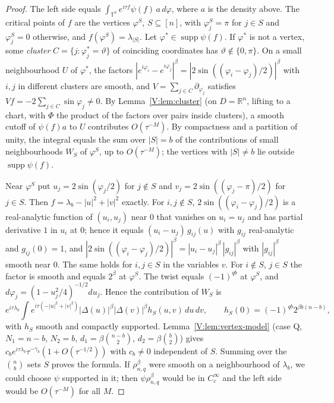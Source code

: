\documentclass[11pt,a4paper]{article}
\theoremstyle{definition}
\theoremstyle{remark}
\newcommand{\R}{\mathbb R}
\newcommand{\T}{\mathbb T}
\DeclareMathOperator{\supp}{supp}
\numberwithin{equation}{section}
\begin{document}
\begin{proof}
The left side equals $\int_{\T^n}e^{i\tau f}\psi(f)\,a\,d\varphi$, where $a$ is the density above. The critical points of $f$ are the vertices $\varphi^S$, $S\subseteq[n]$, with $\varphi^S_j=\pi$ for $j\in S$ and $\varphi^S_j=0$ otherwise, and $f(\varphi^S)=\lambda_{|S|}$. Let $\varphi^*\in\supp\psi(f)$. If $\varphi^*$ is not a vertex, some \emph{cluster} $C=\{j:\varphi^*_j=\vartheta\}$ of coinciding coordinates has $\vartheta\notin\{0,\pi\}$. On a small neighbourhood $U$ of $\varphi^*$, the factors $|e^{i\varphi_i}-e^{i\varphi_j}|^\beta=|2\sin((\varphi_i-\varphi_j)/2)|^\beta$ with $i,j$ in different clusters are smooth, and $V=\sum_{j\in C}\partial_{\varphi_j}$ satisfies $Vf=-2\sum_{j\in C}\sin\varphi_j\ne0$. By Lemma~\ref{V:lem:cluster} (on $D=\R^n$, lifting to a chart, with $\Phi$ the product of the factors over pairs inside clusters), a smooth cutoff of $\psi(f)a$ to $U$ contributes $O(\tau^{-M})$. By compactness and a partition of unity, the integral equals the sum over $|S|=b$ of the contributions of small neighbourhoods $W_S$ of $\varphi^S$, up to $O(\tau^{-M})$; the vertices with $|S|\ne b$ lie outside $\supp\psi(f)$.

Near $\varphi^S$ put $u_j=2\sin(\varphi_j/2)$ for $j\notin S$ and $v_j=2\sin((\varphi_j-\pi)/2)$ for $j\in S$. Then $f=\lambda_b-|u|^2+|v|^2$ exactly. For $i,j\notin S$, $2\sin((\varphi_i-\varphi_j)/2)$ is a real-analytic function of $(u_i,u_j)$ near $0$ that vanishes on $u_i=u_j$ and has partial derivative $1$ in $u_i$ at $0$; hence it equals $(u_i-u_j)\,g_{ij}(u)$ with $g_{ij}$ real-analytic and $g_{ij}(0)=1$, and $|2\sin((\varphi_i-\varphi_j)/2)|^\beta=|u_i-u_j|^\beta\,|g_{ij}|^\beta$ with $|g_{ij}|^\beta$ smooth near $0$. The same holds for $i,j\in S$ in the variables $v$. For $i\notin S$, $j\in S$ the factor is smooth and equals $2^\beta$ at $\varphi^S$. The twist equals $(-1)^{qb}$ at $\varphi^S$, and $d\varphi_j=(1-u_j^2/4)^{-1/2}du_j$. Hence the contribution of $W_S$ is
\[
e^{i\tau\lambda_b}\int e^{i\tau(-|u|^2+|v|^2)}|\Delta(u)|^\beta|\Delta(v)|^\beta h_S(u,v)\,du\,dv,\qquad h_S(0)=(-1)^{qb}2^{\beta b(n-b)},
\]
with $h_S$ smooth and compactly supported. Lemma~\ref{V:lem:vertex-model} (case Q, $N_1=n-b$, $N_2=b$, $d_1=\beta\binom{n-b}2$, $d_2=\beta\binom b2$) gives $c_be^{i\tau\lambda_b}\tau^{-\gamma_b}(1+O(\tau^{-1/2}))$ with $c_b\ne0$ independent of $S$. Summing over the $\binom nb$ sets $S$ proves the formula. If $\rho^\beta_{n,q}$ were smooth on a neighbourhood of $\lambda_b$, we could choose $\psi$ supported in it; then $\psi\rho^\beta_{n,q}$ would be in $C^\infty_c$ and the left side would be $O(\tau^{-M})$ for all $M$.
\end{proof}
\end{document}
